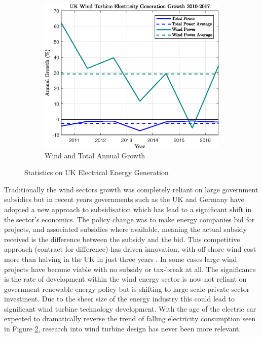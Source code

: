 \documentclass[11pt]{article}
\begin{document}
\begin{figure}[ht]
\begin{subfigure}[b]{0.475\textwidth}
            \includegraphics[width=\textwidth]{WindGrowth}
            \caption[]%
            {{\small Wind and Total Annual Growth}}    
            \label{fig:windgrowth}
        \end{subfigure}
        \caption[ The Effect of Mesh Size on Temperature Resolution ]
        {\small Statistics on UK Electrical Energy Generation} 
        \label{fig:ukenergy}
    \end{figure}

Traditionally the wind sectors growth was completely reliant on large government subsidies but in recent years governments such as the UK and Germany have adopted a new approach to subsidisation which has lead to a significant shift in the sector's economics. The policy change was to make energy companies bid for projects, and associated subsidies where available, meaning the actual subsidy received is the difference between the subsidy and the bid. This competitive approach (contract for difference) has driven innovation, with off-shore wind cost more than halving in the UK in just three years \cite{FT}. In some cases large wind projects have become viable with no subsidy or tax-break at all. The significance is the rate of development within the wind energy sector is now not reliant on government renewable energy policy but is shifting to large scale private sector investment. Due to the sheer size of the energy industry this could lead to significant wind turbine technology development. With the age of the electric car expected to dramatically reverse the trend of falling electricity consumption seen in Figure \ref{fig:ukenergy}, research into wind turbine design has never been more relevant. \\
\end{document}
